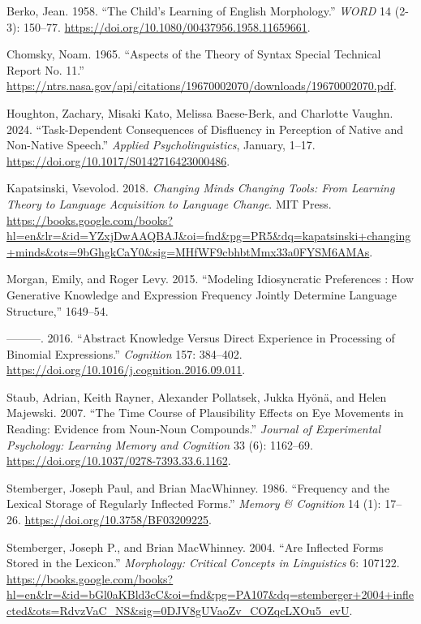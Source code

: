 \documentclass[
  letterpaper,
  DIV=11,
  numbers=noendperiod,
  nottoc,
  oneside]{scrreprt}
\newlength{\cslhangindent}
\newenvironment{CSLReferences}[2] %
 {\begin{list}{}{%
  \setlength{\itemindent}{0pt}
  \setlength{\leftmargin}{0pt}
  \setlength{\parsep}{0pt}
  \ifodd #1
   \setlength{\leftmargin}{\cslhangindent}
   \setlength{\itemindent}{-1\cslhangindent}
  \fi
  \setlength{\itemsep}{#2\baselineskip}}}
 {\end{list}}
\begin{document}
\label{refs}
\begin{CSLReferences}{1}{0}
Berko, Jean. 1958. {``The Child's Learning of English Morphology.''}
\emph{{\emph{WORD}}} 14 (2-3): 150--77.
\url{https://doi.org/10.1080/00437956.1958.11659661}.

Chomsky, Noam. 1965. {``Aspects of the Theory of Syntax Special
Technical Report No. 11.''}
\url{https://ntrs.nasa.gov/api/citations/19670002070/downloads/19670002070.pdf}.

Houghton, Zachary, Misaki Kato, Melissa Baese-Berk, and Charlotte
Vaughn. 2024. {``Task-Dependent Consequences of Disfluency in Perception
of Native and Non-Native Speech.''} \emph{Applied Psycholinguistics},
January, 1--17. \url{https://doi.org/10.1017/S0142716423000486}.

Kapatsinski, Vsevolod. 2018. \emph{Changing Minds Changing Tools: From
Learning Theory to Language Acquisition to Language Change}. MIT Press.
\url{https://books.google.com/books?hl=en&lr=&id=YZxjDwAAQBAJ&oi=fnd&pg=PR5&dq=kapatsinski+changing+minds&ots=9bGhgkCaY0&sig=MHfWF9cbhbtMmx33a0FYSM6AMAs}.

Morgan, Emily, and Roger Levy. 2015. {``Modeling Idiosyncratic
Preferences : How Generative Knowledge and Expression Frequency Jointly
Determine Language Structure,''} 1649--54.

---------. 2016. {``Abstract Knowledge Versus Direct Experience in
Processing of Binomial Expressions.''} \emph{Cognition} 157: 384--402.
\url{https://doi.org/10.1016/j.cognition.2016.09.011}.

Staub, Adrian, Keith Rayner, Alexander Pollatsek, Jukka Hyönä, and Helen
Majewski. 2007. {``The Time Course of Plausibility Effects on Eye
Movements in Reading: Evidence from Noun-Noun Compounds.''}
\emph{Journal of Experimental Psychology: Learning Memory and Cognition}
33 (6): 1162--69. \url{https://doi.org/10.1037/0278-7393.33.6.1162}.

Stemberger, Joseph Paul, and Brian MacWhinney. 1986. {``Frequency and
the Lexical Storage of Regularly Inflected Forms.''} \emph{Memory \&
Cognition} 14 (1): 17--26. \url{https://doi.org/10.3758/BF03209225}.

Stemberger, Joseph P., and Brian MacWhinney. 2004. {``Are Inflected
Forms Stored in the Lexicon.''} \emph{Morphology: Critical Concepts in
Linguistics} 6: 107122.
\url{https://books.google.com/books?hl=en&lr=&id=bGl0aKBld3cC&oi=fnd&pg=PA107&dq=stemberger+2004+inflected&ots=RdvzVaC_NS&sig=0DJV8gUVaoZv_COZqcLXOu5_evU}.

\end{CSLReferences}
\end{document}
